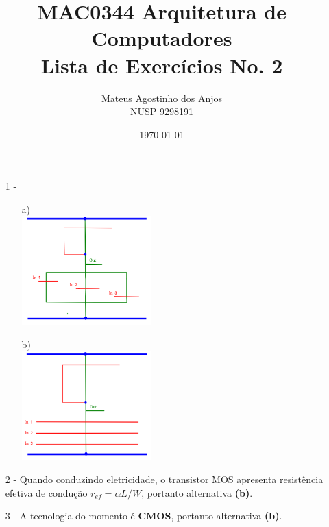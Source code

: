 \documentclass[12pt]{article}
\title{MAC0344 Arquitetura de Computadores\\
Lista de Exercícios No. 2
}
\author{Mateus Agostinho dos Anjos\\NUSP 9298191}
\date{\today}
\begin{document}
	\maketitle
	\begin{itemize}
		\item[1 -]
			\hfill\\
			\begin{itemize}
				\item[a)]
					\hfill \\
					\includegraphics[width=5cm]{porta_NOR_3_entradas.png}
				\item[b)]
					\hfill \\
					\includegraphics[width=5cm]{porta_NAND_3_entradas.png}
			\end{itemize}
		\item[2 -]
			Quando conduzindo eletricidade, o transistor MOS apresenta
			resistência efetiva de condução $r_{ef} = \alpha L/W$,
			portanto alternativa \textbf{(b)}.
		\item[3 -]
			A tecnologia do momento é \textbf{CMOS}, portanto
			alternativa \textbf{(b)}.
	\end{itemize}
\end{document}
